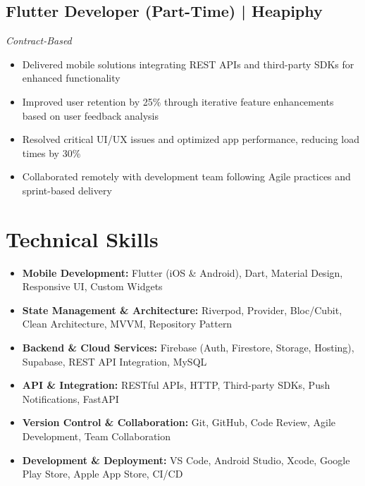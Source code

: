 \documentclass[a4paper,11pt]{article}
\begin{document}
\subsection{Flutter Developer (Part-Time) | Heapiphy}
\textit{Contract-Based} \\
\begin{itemize}[leftmargin=*,noitemsep,topsep=4pt]
    \item Delivered mobile solutions integrating REST APIs and third-party SDKs for enhanced functionality
    \item Improved user retention by 25\% through iterative feature enhancements based on user feedback analysis
    \item Resolved critical UI/UX issues and optimized app performance, reducing load times by 30\%
    \item Collaborated remotely with development team following Agile practices and sprint-based delivery
\end{itemize}


\section{Technical Skills}

\begin{itemize}[leftmargin=*,noitemsep,topsep=4pt]
    \item \textbf{Mobile Development:} Flutter (iOS \& Android), Dart, Material Design, Responsive UI, Custom Widgets
    \item \textbf{State Management \& Architecture:} Riverpod, Provider, Bloc/Cubit, Clean Architecture, MVVM, Repository Pattern
    \item \textbf{Backend \& Cloud Services:} Firebase (Auth, Firestore, Storage, Hosting), Supabase, REST API Integration, MySQL
    \item \textbf{API \& Integration:} RESTful APIs, HTTP, Third-party SDKs, Push Notifications, FastAPI
    \item \textbf{Version Control \& Collaboration:} Git, GitHub, Code Review, Agile Development, Team Collaboration
    \item \textbf{Development \& Deployment:} VS Code, Android Studio, Xcode, Google Play Store, Apple App Store, CI/CD
\end{itemize}
\end{document}
